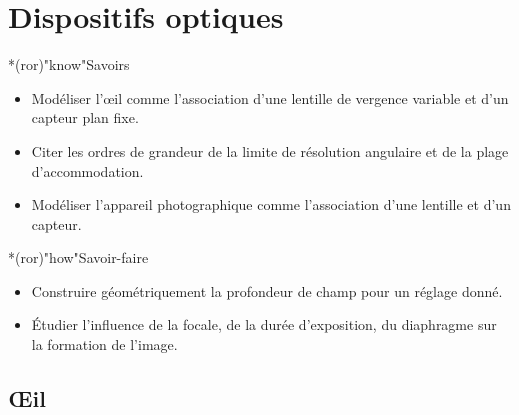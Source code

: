 \documentclass[../../main/main.tex]{subfiles}
\begin{document}
\setcounter{chapter}{3}

\chapter{Dispositifs optiques}

\vfill

\begin{prgm}
	\begin{tcb}*(ror)"know"{Savoirs}
		\begin{itemize}[label=$\diamond$, leftmargin=10pt]
			\item Modéliser l'œil comme l'association d'une lentille de vergence
			      variable et d'un capteur plan fixe.
			\item Citer les ordres de grandeur de la limite de résolution angulaire et
			      de la plage d'accommodation.
			\item Modéliser l'appareil photographique comme
			      l'association d'une lentille et d'un capteur.
		\end{itemize}
	\end{tcb}

	\begin{tcb}*(ror)"how"{Savoir-faire}
		\begin{itemize}[label=$\diamond$, leftmargin=10pt]
			\item Construire géométriquement la profondeur de champ
			      pour un réglage donné.
			\item Étudier l'influence de la focale, de la durée d'exposition, du
			      diaphragme sur la formation de l'image.
		\end{itemize}
	\end{tcb}
\end{prgm}

\vfill
\minitoc
\vfill

\newpage

\section{Œil}
\end{document}
